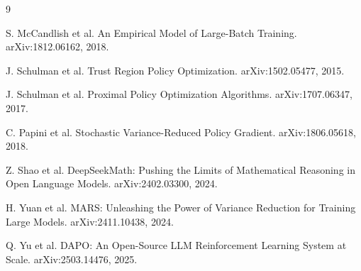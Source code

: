 \documentclass[11pt,a4paper]{article}
\begin{document}
\newpage
\begin{thebibliography}{9}

S. McCandlish et al.
\newblock An Empirical Model of Large-Batch Training.
\newblock arXiv:1812.06162, 2018.

J. Schulman et al.
\newblock Trust Region Policy Optimization.
\newblock arXiv:1502.05477, 2015.

J. Schulman et al.
\newblock Proximal Policy Optimization Algorithms.
\newblock arXiv:1707.06347, 2017.

C. Papini et al.
\newblock Stochastic Variance-Reduced Policy Gradient.
\newblock arXiv:1806.05618, 2018.

Z. Shao et al.
\newblock DeepSeekMath: Pushing the Limits of Mathematical Reasoning in Open Language Models.
\newblock arXiv:2402.03300, 2024.

H. Yuan et al.
\newblock MARS: Unleashing the Power of Variance Reduction for Training Large Models.
\newblock arXiv:2411.10438, 2024.

Q. Yu et al.
\newblock DAPO: An Open-Source LLM Reinforcement Learning System at Scale.
\newblock arXiv:2503.14476, 2025.

\end{thebibliography}
\end{document}
